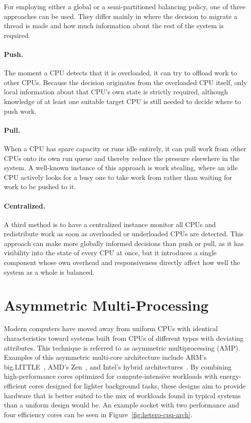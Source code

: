 For employing either a global or a semi-partitioned balancing policy, one of three approaches can be used.
They differ mainly in where the decision to migrate a thread is made and how much information about the rest of the system is required.

\paragraph{Push.}

The moment a CPU detects that it is overloaded, it can try to offload work to other CPUs.
Because the decision originates from the overloaded CPU itself, only local information about that CPU's own state is strictly required, although knowledge of at least one suitable target CPU is still needed to decide where to push work.

\paragraph{Pull.}

When a CPU has spare capacity or runs idle entirely, it can pull work from other CPUs onto its own run queue and thereby reduce the pressure elsewhere in the system.
A well-known instance of this approach is work stealing, where an idle CPU actively looks for a busy one to take work from rather than waiting for work to be pushed to it.

\paragraph{Centralized.}

A third method is to have a centralized instance monitor all CPUs and redistribute work as soon as overloaded or underloaded CPUs are detected.
This approach can make more globally informed decisions than push or pull, as it has visibility into the state of every CPU at once, but it introduces a single component whose own overhead and responsiveness directly affect how well the system as a whole is balanced.

\section{Asymmetric Multi-Processing}
\label{sec:amp}

Modern computers have moved away from uniform CPUs with identical characteristics toward systems built from CPUs of different types with deviating attributes.
This technique is referred to as asymmetric multiprocessing (AMP).
Examples of this asymmetric multi-core architecture include ARM's big.LITTLE~\cite{arm_big_little_2026}, AMD's Zen~\cite{amd_zen_core_2026}, and Intel's hybrid architectures~\cite{intel_hybrid_architecture_2026}.
By combining high-performance cores optimized for compute-intensive workloads with energy-efficient cores designed for lighter background tasks, these designs aim to provide hardware that is better suited to the mix of workloads found in typical systems than a uniform design would be.
An example socket with two performance and four efficiency cores can be seen in Figure~\ref{fig:hetero-cpu-arch}.

